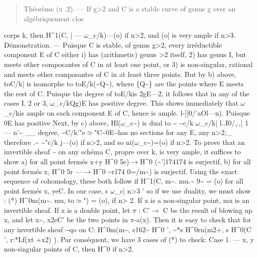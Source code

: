 \documentclass[11pt]{article}
\theoremstyle{plain}
\theoremstyle{definition}
\theoremstyle{remark}
\begin{document}
\begin{quote}Th\'eor\`eme (x .2). --- If g>2 and C is a stable curve of genus g over an alg\'ebriquement clos\end{quote}
corps k, then H\textasciicircum{}1(C, | --- $\omega$\_c/k)---(o) if n>2, and (o| is very ample if n>3. D\'emonstration. --- Puisque C is stable, of genus g>2, every irr\'eductible component E of C either i) has (arithmetic) genus >2 itself, 2) has genus I, but meets other composantes of C in at least one point, or 3) is non-singular, rational and meets other composantes of C in at least three points. But by b) above, toC/k| is isomorphe to toE/k(\textasciitilde{}Q\textasciitilde{}), where \{Q\textasciitilde{}\} are the points where E meets the rest of C. Puisque the degree of toE/kis 2gE---2, it follows that in any of the cases I, 2 or 3, $\omega$\_c/kQg)E has positive degree. This shows immediately that $\omega$\_c/kis ample on each component E of C, hence is ample. l-][0/'aOl---n). Puisque 0E has positive Next, by c) above, Hl($\omega$\_c\textasciitilde{}) is dual to \textasciitilde{} \textasciitilde{}c/k $\omega$\_c/k| l..I0/,.,| 1 --- n'\textasciitilde{} \_\_ degree, \textasciitilde{}C/k'"e$\simeq$"C\textasciitilde{}0E\textasciitilde{}has no sections for any E, any n>2;\_ therefore .\textasciitilde{} \textasciitilde{}"c/k j---(o) if n>2, and so ni($\omega$\_c\textasciitilde{})=(o) if n>2. To prove that an invertible sheaf \textasciitilde{} on any sch\'ema C, propre over k, is very ample, it suffices to show a) for all point ferm\'es x+y H\textasciicircum{}0 5e)$\to$H\textasciicircum{}0 (\textasciitilde{}'|174174 is surjectif, b) for all point ferm\'es x, H\textasciicircum{}0 5r ---$\to$H\textasciicircum{}0 \textasciitilde{}r174 0=/m\textasciitilde{}) is surjectif. Using the exact sequence of cohomology, these both follow if H\textasciicircum{}1(C, m\textasciitilde{}. mu.\textasciitilde{} 9\textasciitilde{} = (o) for all point ferm\'es x, yeC. In our case, s $\omega$\_c| n>3 ' so if we use duality, we must show : (*) H\textasciicircum{}0m(m\textasciitilde{}. mu, to$\simeq$") = (o), if n> 2. If x is a non-singular point, mx is an invertible sheaf. If x is a double point, let $\pi$ : C'$\to$ C be the result of blowing up x, and let x\textasciitilde{}, x2eC' be the two points in $\pi$-a(x). Then it is easy to check that for any invertible sheaf \textasciitilde{}qo on C: H\textasciicircum{}0m(m\textasciitilde{}, s162\textasciitilde{} H\textasciicircum{}0 ', \textasciitilde{}*s H\textasciicircum{}0rn(m2+, s H\textasciicircum{}0(C ', r:*Lf(xt +x2) ). Par cons\'equent, we have 3 cases of (*) to check: Case 1. --- x, y non-singular points of C, then H\textasciicircum{}0 if n>2.
\end{document}
